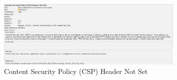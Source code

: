 \documentclass[openany]{report}
\begin{document}
\begin{enumerate}
\begin{figure}[H]
              \label{fig:my_label2}
          \end{figure}
          \begin{figure}[H]
              \centering
              \includegraphics[width=0.8\textwidth]{imgs/Medium.jpg}
              \caption{Content Security Policy (CSP) Header Not Set}
              \label{fig:my_label3}
          \end{figure}
\end{enumerate}
\end{document}
